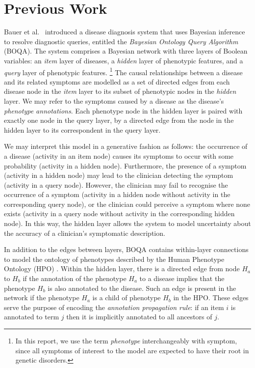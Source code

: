 \section{Previous Work}
\label{sec:lit-rev}

Bauer et al.\ \cite{bauer2012bayesian} introduced a disease diagnosis system
that uses Bayesian inference to resolve diagnostic queries, entitled the 
{\it Bayesian Ontology Query Algorithm} (BOQA).
%
The system comprises a Bayesian network with three layers of Boolean variables:
an {\it item} layer of diseases, a {\it hidden} layer of phenotypic features,
and a {\it query} layer of phenotypic features.
%
\footnote{
    In this report, we use the term {\it phenotype} interchangeably with symptom,
    since all symptoms of interest to the model are expected to have their root
    in genetic disorders.
}
%
The causal relationships between a disease and its related symptoms are modelled
as a set of directed edges from each disease node in the {\it item} layer to its
subset of phenotypic nodes in the {\it hidden} layer.
%
We may refer to the symptoms caused by a disease as the disease's {\it phenotype
annotations}.
%
Each phenotype node in the hidden layer is paired with exactly one node in the
query layer, by a directed edge from the node in the hidden layer to its
correspondent in the query layer.

We may interpret this model in a generative fashion as follows:
%
the occurrence of a disease (activity in an item node) causes its symptoms to
occur with some probability (activity in a hidden node). Furthermore, the
presence of a symptom (activity in a hidden node) may lead to the clinician
detecting the symptom (activity in a query node). However, the clinician may
fail to recognise the occurrence of a symptom (activity in a hidden node without
activity in the corresponding query node), or the clinician could perceive a
symptom where none exists (activity in a query node without
activity in the corresponding hidden node).
%
In this way, the hidden layer allows the system to model uncertainty about the
accuracy of a clinician's symptomatic description.

In addition to the edges between layers, BOQA contains within-layer connections
to model the ontology of phenotypes described by the Human Phenotype Ontology
(HPO) \cite{kohler2014hpo}.
%
Within the hidden layer, there is a directed edge from node $H_a$ to $H_b$
if the annotation of the phenotype $H_a$ to a disease implies that the phenotype
$H_b$ is also annotated to the disease.
%
Such an edge is present in the network if the phenotype $H_a$ is a child of
phenotype $H_b$ in the HPO. 
%
These edges serve the purpose of encoding the {\it annotation propagation rule}:
if an item $i$ is annotated to term $j$ then it is implicitly annotated to all
ancestors of $j$.

